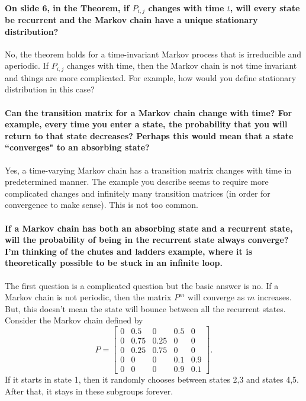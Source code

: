 \documentclass[10pt,english]{article}
\begin{document}
\paragraph{On slide 6, in the Theorem, if $P_{i,j}$ changes with time $t$, will every state be recurrent and the Markov chain have a unique stationary distribution?}

No, the theorem holds for a time-invariant Markov process that is irreducible and aperiodic.
If $P_{i,j}$ changes with time, then the Markov chain is not time invariant and things are more complicated.
For example, how would you define stationary distribution in this case?

\paragraph{Can the transition matrix for a Markov chain change with time? For example, every time you enter a state, the probability that you will return to that state decreases? Perhaps this would mean that a state ``converges" to an absorbing state?}

Yes, a time-varying Markov chain has a transition matrix changes with time in predetermined manner.
The example you describe seems to require more complicated changes and infinitely many transition matrices (in order for convergence to make sense).
This is not too common.

\paragraph{If a Markov chain has both an absorbing state and a recurrent state, will the probability of being in the recurrent state always converge? I'm thinking of the chutes and ladders example, where it is theoretically possible to be stuck in an infinite loop.}

The first question is a complicated question but the basic answer is no.
If a Markov chain is not periodic, then the matrix $P^m$ will converge as $m$ increases.
But, this doesn't mean the state will bounce between all the recurrent states.
Consider the Markov chain defined by
$$P=\begin{bmatrix} 0 & 0.5 & 0 & 0.5 & 0 \\ 0 & 0.75 & 0.25 & 0 & 0 \\ 0 & 0.25 & 0.75 & 0 & 0 \\ 0 & 0 & 0 & 0.1 & 0.9 \\ 0 & 0 & 0 & 0.9 & 0.1 \end{bmatrix}.$$
If it starts in state 1, then it randomly chooses between states 2,3 and states 4,5.
After that, it stays in these subgroups forever.
\end{document}
